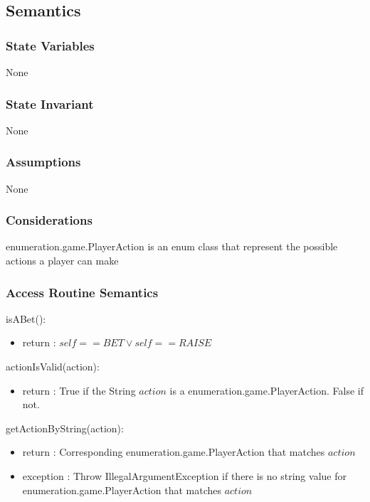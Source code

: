 \documentclass[12pt, titlepage]{article}
\begin{document}
    \subsection* {Semantics}
    
    \subsubsection* {State Variables}
        None
        
    \subsubsection* {State Invariant}
        None
    
    \subsubsection* {Assumptions}
        None
    
    \subsubsection* {Considerations}
        enumeration.game.PlayerAction is an enum class that represent the possible actions a player can make
    
    \subsubsection* {Access Routine Semantics}
    
        \noindent isABet():
        \begin{itemize}
        \item return : $self == BET \vee self == RAISE$
        \end{itemize}
        
        \noindent actionIsValid(action):
        \begin{itemize}
        \item return : True if the String $action$ is a enumeration.game.PlayerAction. False if not.
        \end{itemize}
        
        \noindent getActionByString(action):
        \begin{itemize}
        \item return : Corresponding enumeration.game.PlayerAction that matches $action$
        \item exception : Throw IllegalArgumentException if there is no  string value for enumeration.game.PlayerAction that matches $action$
        \end{itemize}
         
\end{document}
